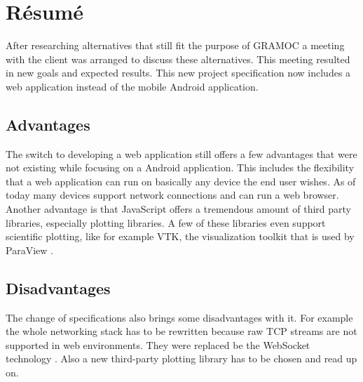 \chapter{Résumé}

\author{Nico Kratky}
%
After researching alternatives that still fit the purpose of GRAMOC a meeting with the client was arranged to discuss these alternatives. This meeting resulted in new goals and expected results. This new project specification now includes a web application instead of the mobile Android application.

\section{Advantages}
The switch to developing a web application still offers a few advantages that were not existing while focusing on a Android application. This includes the flexibility that a web application can run on basically any device the end user wishes. As of today many devices support network connections and can run a web browser. Another advantage is that JavaScript offers a tremendous amount of third party libraries, especially plotting libraries. A few of these libraries even support scientific plotting, like for example VTK, the visualization toolkit that is used by ParaView \cite{VTK}.

\section{Disadvantages}
The change of specifications also brings some disadvantages with it. For example the whole networking stack has to be rewritten because raw TCP streams are not supported in web environments. They were replaced be the WebSocket technology \cite{rfc6455}. Also a new third-party plotting library has to be chosen and read up on.
